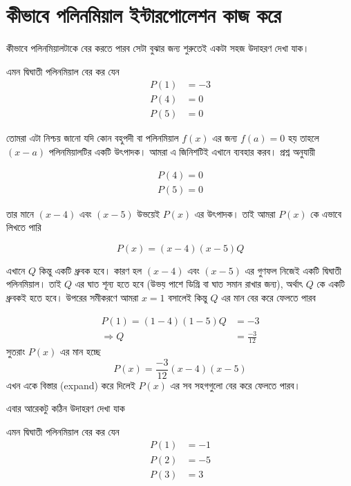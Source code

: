 \section{কীভাবে পলিনমিয়াল ইন্টারপোলেশন কাজ করে }
কীভাবে পলিনমিয়ালটাকে বের করতে পারব সেটা বুঝার জন্য শুরুতেই একটা সহজ উদাহরণ দেখা যাক। 
\begin{example}
এমন দ্বিঘাতী পলিনমিয়াল বের কর যেন 
\begin{align*}
P(1) & = -3 \\
P(4) & = 0 \\
P(5) & = 0 
\end{align*}
\end{example}
\begin{solution}
তোমরা এটা নিশ্চয় জানো যদি কোন বহুপদী বা পলিনমিয়াল $f(x)$ এর জন্য $f(a) = 0$ হয় তাহলে $(x - a)$ পলিনমিয়ালটির একটি উৎপাদক। আমরা এ জিনিশটিই এখানে ব্যবহার করব। প্রশ্ন অনুযায়ী 

\begin{align*}
P(4) = 0 \\
P(5) = 0
\end{align*} 

তার মানে $(x - 4)$ এবং $(x - 5)$ উভয়েই $P(x)$ এর উৎপাদক। তাই আমরা $P(x)$ কে এভাবে লিখতে পারি

$$ P(x) = (x - 4)(x - 5)Q$$

এখানে $Q$ কিন্তু একটি ধ্রুবক হবে। কারণ হল $(x - 4)$ এবং $(x - 5)$ এর গুণফল নিজেই একটি দ্বিঘাতী পলিনমিয়াল। তাই $Q$ এর ঘাত শূন্য হতে হবে (উভয় পাশে ডিগ্রি বা ঘাত সমান রাখার জন্য), অর্থাৎ $Q$ কে একটি ধ্রুবকই হতে হবে। উপরের সমীকরণে আমরা $x = 1$ বসালেই কিন্তু $Q$ এর মান বের করে ফেলতে পারব 

\begin{align*}
P(1) = (1 - 4)(1 - 5)Q & = -3 \\
       \Rightarrow   Q & = \frac{-3}{12}     
\end{align*} 
সুতরাং $P(x)$ এর মান হচ্ছে 
$$P(x) = \frac{-3}{12} (x - 4)(x - 5)$$
এখন একে বিস্তার (expand) করে দিলেই $P(x)$ এর সব সহগগুলো বের করে ফেলতে পারব। 
\end{solution}

এবার আরেকটু কঠিন উদাহরণ দেখা যাক 
\begin{example}
এমন দ্বিঘাতী পলিনমিয়াল বের কর যেন 
\begin{align*}
P(1) & = -1 \\
P(2) & = -5 \\
P(3) & = 3
\end{align*}
\end{example}

